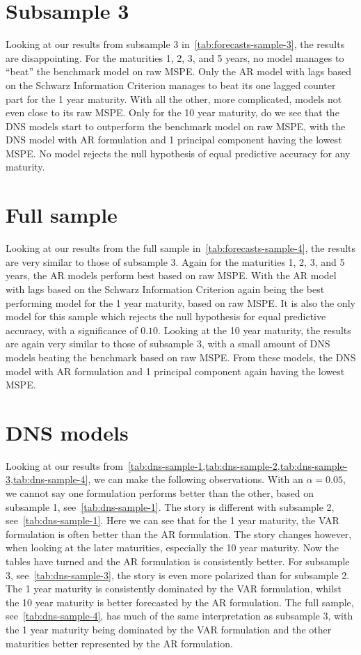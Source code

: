 \section{Subsample 3}
Looking at our results from subsample 3 in~\cref{tab:forecasts-sample-3}, the results are disappointing. 
For the maturities 1, 2, 3, and 5 years, no model manages to \enquote{beat} the benchmark model on raw MSPE. 
Only the AR model with lags based on the Schwarz Information Criterion manages to beat its one lagged counter part for the 1 year maturity. 
With all the other, more complicated, models not even close to its raw MSPE. 
Only for the 10 year maturity, do we see that the DNS models start to outperform the benchmark model on raw MSPE, with the DNS model with AR formulation and 1 principal component having the lowest MSPE.
No model rejects the null hypothesis of equal predictive accuracy for any maturity. 

\section{Full sample}
Looking at our results from the full sample in~\cref{tab:forecasts-sample-4}, the results are very similar to those of subsample 3. 
Again for the maturities 1, 2, 3, and 5 years, the AR models perform best based on raw MSPE. 
With the AR model with lags based on the Schwarz Information Criterion again being the best performing model for the 1 year maturity, based on raw MSPE.
It is also the only model for this sample which rejects the null hypothesis for equal predictive accuracy, with a significance of $0.10$. 
Looking at the 10 year maturity, the results are again very similar to those of subsample 3, with a small amount of DNS models beating the benchmark based on raw MSPE.
From these models, the DNS model with AR formulation and 1 principal component again having the lowest MSPE. 

\section{DNS models}
Looking at our results from~\cref{tab:dns-sample-1,tab:dns-sample-2,tab:dns-sample-3,tab:dns-sample-4}, we can make the following observations. 
With an $\alpha = 0.05$, we cannot say one formulation performs better than the other, based on subsample 1, see~\cref{tab:dns-sample-1}. 
The story is different with subsample 2, see~\cref{tab:dns-sample-1}. 
Here we can see that for the 1 year maturity, the VAR formulation is often better than the AR formulation.
The story changes however, when looking at the later maturities, especially the 10 year maturity.
Now the tables have turned and the AR formulation is consistently better.
For subsample 3, see~\cref{tab:dns-sample-3}, the story is even more polarized than for subsample 2. 
The 1 year maturity is consistently dominated by the VAR formulation, whilst the 10 year maturity is better forecasted by the AR formulation. 
The full sample, see~\cref{tab:dns-sample-4}, has much of the same interpretation as subsample 3, with the 1 year maturity being dominated by the VAR formulation and the other maturities better represented by the AR formulation.

